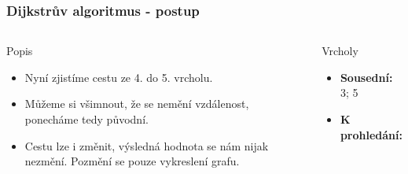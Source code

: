 \documentclass{beamer}
\begin{document}
\begin{frame}
    \frametitle{Dijkstrův algoritmus - postup}
    \begin{columns}
        \begin{block}{Popis}
            \begin{itemize}
                \item Nyní zjistíme cestu ze 4. do 5. vrcholu.
                \item Můžeme si všimnout, že se nemění vzdálenost, ponecháme tedy původní.
                \item Cestu lze i změnit, výsledná hodnota se nám nijak nezmění. Pozmění se pouze vykreslení grafu.
            \end{itemize}
        \end{block}
        \begin{block}{Vrcholy}
            \begin{itemize}
                \item \textbf{Sousední:} 3; 5
                \item \textbf{K prohledání:} 
            \end{itemize}
        \end{block}
    \end{columns}
\end{frame}
\end{document}
